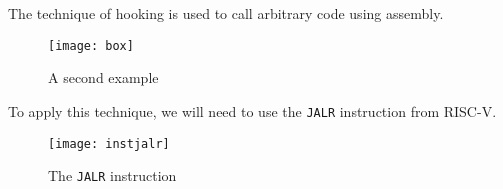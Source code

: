 The technique of hooking is used to call arbitrary code using assembly.


\begin{figure}[ht]
	\centering
	\texttt{[image: box]}
	\caption{A second example}
	\label{fig:exmemmap2}
\end{figure}


To apply this technique, we will need to use the \texttt{JALR}
instruction from RISC-V.

\begin{figure*}[ht]
	\centering
	\texttt{[image: instjalr]}
	\caption{The \texttt{JALR} instruction}
	\label{fig:instjalr}
\end{figure*}
